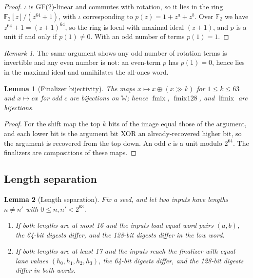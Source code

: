 \documentclass[10pt,a4paper]{article}
\newtheorem{lemma}{Lemma}
\theoremstyle{remark}
\newtheorem{remark}{Remark}
\newcommand{\fmix}{\operatorname{fmix}}
\newcommand{\fmixw}{\operatorname{fmix128}}
\newcommand{\lfmix}{\operatorname{lfmix}}
\newcommand{\W}{\mathbb{W}}
\begin{document}
\begin{proof}
\(\iota\) is GF(2)-linear and commutes with rotation, so it lies in the ring
\(\mathbb{F}_2[z]/(z^{64}+1)\), with \(\iota\) corresponding to
\(p(z) = 1 + z^a + z^b\).  Over \(\mathbb{F}_2\) we have
\(z^{64}+1 = (z+1)^{64}\), so the ring is local with maximal ideal
\((z+1)\), and \(p\) is a unit if and only if \(p(1) \neq 0\).  With an odd
number of terms \(p(1) = 1\).
\end{proof}

\begin{remark}
The same argument shows any odd number of rotation terms is invertible and
any even number is not: an even-term \(p\) has \(p(1)=0\), hence lies in the
maximal ideal and annihilates the all-ones word.
\end{remark}

\begin{lemma}[Finalizer bijectivity]
\label{lem:fmix}
The maps \(x \mapsto x \oplus (x \mathbin{\gg} k)\) for \(1 \leq k \leq 63\)
and \(x \mapsto cx\) for odd \(c\) are bijections on \(\W\); hence
\(\fmix\), \(\fmixw\), and \(\lfmix\) are bijections.
\end{lemma}

\begin{proof}
For the shift map the top \(k\) bits of the image equal those of the
argument, and each lower bit is the argument bit XOR an already-recovered
higher bit, so the argument is recovered from the top down.  An odd \(c\) is
a unit modulo \(2^{64}\).  The finalizers are compositions of these maps.
\end{proof}

\subsection{Length separation}
\label{sec:length}

\begin{lemma}[Length separation]
\label{lem:length}
Fix a seed, and let two inputs have lengths \(n \neq n'\) with
\(0 \leq n, n' < 2^{63}\).
\begin{enumerate}
\item If both lengths are at most 16 and the inputs load equal word pairs
      \((a,b)\), the 64-bit digests differ, and the 128-bit digests differ in
      the low word.
\item If both lengths are at least 17 and the inputs reach the finalizer with
      equal lane values \((h_0,h_1,h_2,h_3)\), the 64-bit digests differ, and
      the 128-bit digests differ in both words.
\end{enumerate}
\end{lemma}
\end{document}
